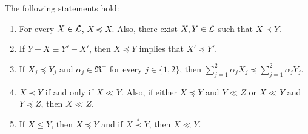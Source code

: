 \begin{lemma} 
 \label{lemma:nonstd_2}
 The following statements hold:
 \begin{enumerate}[leftmargin=*]
  \item For every $X \in \mathcal{L}$, 
  $X \preceq X$. Also, there exist
  $X, Y \in \mathcal{L}$ such that $X \prec Y$.
  
  \item If $Y-X \equiv Y'-X'$, then
  $X \preceq Y$ implies that $X' \preceq Y'$.
  
  \item If $X_j \preceq Y_j$ and 
  $\alpha_j \in \Re^{+}$ for every $j \in \{1,2\}$, then
  $\sum_{j=1}^2 \alpha_j X_j \preceq \sum_{j=1}^2 \alpha_j Y_j$.
  
  \item $X \prec Y$ if and only if $X \ll Y$.
  Also, if either $X \preceq Y$ and $Y \ll Z$ or
  $X \ll Y$ and $Y \preceq Z$, then $X \ll Z$.
  
  \item If $X \leq Y$, then $X \preceq Y$ and if
  $X \stackrel{*}{\prec} Y$, then $X \ll Y$.
 \end{enumerate}
\end{lemma}

